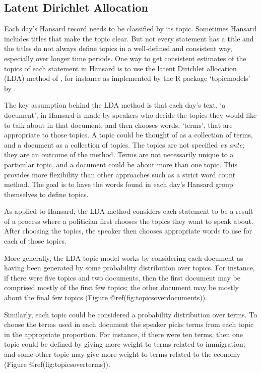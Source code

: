 \documentclass[12pt,]{article}
\begin{document}
\subsection{Latent Dirichlet
Allocation}\label{latent-dirichlet-allocation}

Each day's Hansard record needs to be classified by its topic. Sometimes
Hansard includes titles that make the topic clear. But not every
statement has a title and the titles do not always define topics in a
well-defined and consistent way, especially over longer time periods.
One way to get consistent estimates of the topics of each statement in
Hansard is to use the latent Dirichlet allocation (LDA) method of
\citet{Blei2003latent}, for instance as implemented by the R package
`topicmodels' by \citet{Grun2011}.

The key assumption behind the LDA method is that each day's text, `a
document', in Hansard is made by speakers who decide the topics they
would like to talk about in that document, and then chooses words,
`terms', that are appropriate to those topics. A topic could be thought
of as a collection of terms, and a document as a collection of topics.
The topics are not specified \emph{ex ante}; they are an outcome of the
method. Terms are not necessarily unique to a particular topic, and a
document could be about more than one topic. This provides more
flexibility than other approaches such as a strict word count method.
The goal is to have the words found in each day's Hansard group
themselves to define topics.

As applied to Hansard, the LDA method considers each statement to be a
result of a process where a politician first chooses the topics they
want to speak about. After choosing the topics, the speaker then chooses
appropriate words to use for each of those topics.

More generally, the LDA topic model works by considering each document
as having been generated by some probability distribution over topics.
For instance, if there were five topics and two documents, then the
first document may be comprised mostly of the first few topics; the
other document may be mostly about the final few topics (Figure
@ref(fig:topicsoverdocuments)).

Similarly, each topic could be considered a probability distribution
over terms. To choose the terms used in each document the speaker picks
terms from each topic in the appropriate proportion. For instance, if
there were ten terms, then one topic could be defined by giving more
weight to terms related to immigration; and some other topic may give
more weight to terms related to the economy (Figure
@ref(fig:topicsoverterms)).
\end{document}
